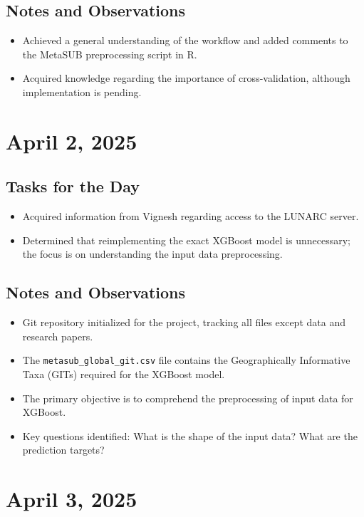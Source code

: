 \documentclass{article}
\begin{document}
\subsection*{Notes and Observations}
\begin{itemize}
    \item Achieved a general understanding of the workflow and added comments to the MetaSUB preprocessing script in R.
    \item Acquired knowledge regarding the importance of cross-validation, although implementation is pending.
\end{itemize}

\section{April 2, 2025}

\subsection*{Tasks for the Day}
\begin{itemize}
    \item Acquired information from Vignesh regarding access to the LUNARC server.
    \item Determined that reimplementing the exact XGBoost model is unnecessary; the focus is on understanding the input data preprocessing.
\end{itemize}

\subsection*{Notes and Observations}
\begin{itemize}
    \item Git repository initialized for the project, tracking all files except data and research papers.
    \item The \texttt{metasub\_global\_git.csv} file contains the Geographically Informative Taxa (GITs) required for the XGBoost model.
    \item The primary objective is to comprehend the preprocessing of input data for XGBoost.
    \item Key questions identified: What is the shape of the input data? What are the prediction targets?
\end{itemize}

\section{April 3, 2025}
\end{document}
